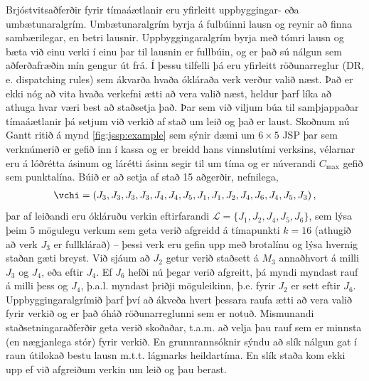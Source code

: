 \documentclass[]{article}
\begin{document}
Brjóstvitsaðferðir fyrir tímaáætlanir eru yfirleitt uppbyggingar- eða 
umbætunaralgrím.
Umbætunaralgrím byrja á fulbúinni lausn og reynir að finna sambærilegar, en 
betri lausnir. 
Uppbyggingaralgrím byrja með tómri lausn og bæta við einu verki í einu þar til 
lausnin er fullbúin, og er það sú nálgun sem aðferðafræðin mín gengur út frá. 
Í þessu tilfelli þá eru yfirleitt röðunarreglur (DR, e. dispatching 
rules) sem ákvarða hvaða ókláraða verk verður valið næst. Það er ekki nóg að 
vita hvaða verkefni ætti að vera valið næst, 
heldur þarf líka að athuga hvar væri best að staðsetja það. 
Þar sem við viljum búa til samþjappaðar tímaáætlanir  þá setjum við verkið af 
stað um leið og það er laust. 
Skoðnum nú Gantt ritið á mynd \ref{fig:jssp:example} sem sýnir dæmi um 
$6\times5$ JSP þar sem verknúmerið er gefið inn í kassa og er breidd hans 
vinnslutími verksins, 
vélarnar eru á lóðrétta ásinum og lárétti ásinn segir til um tíma 
og er núverandi $C_{\max}$ gefið sem punktalína. 
Búið er að setja af stað 15 aðgerðir, nefnilega, 
\begin{eqnarray}
\vchi=\left(J_3,J_3,J_3,J_3,J_4,J_4,J_5,J_1,J_1,J_2,J_4,J_6,J_4,J_5,J_3\right),
\end{eqnarray}
þar af leiðandi eru ókláruðu verkin eftirfarandi 
$\mathcal{L}=\{J_1,J_2,J_4,J_5,J_6\}$, sem lýsa þeim 5 mögulegu verkum sem geta 
verið afgreidd á tímapunkti $k=16$ (athugið að verk $J_3$ er fullklárað) -- 
þessi verk eru gefin upp með brotalínu og lýsa hvernig staðan gæti breyst. 
Við sjáum að $J_2$ getur verið staðsett á $M_3$ annaðhvort á milli  $J_3$ og 
$J_4$, eða eftir $J_4$.  Ef $J_6$ hefði nú þegar verið afgreitt, þá myndi 
myndast rauf á milli þess og $J_4$, þ.a.l. myndast þriðji möguleikinn, þ.e. 
fyrir $J_2$ er sett eftir $J_6$. 
Uppbyggingaralgrímið þarf því að ákveða hvert þessara raufa ætti að vera 
valið fyrir verkið og er það óháð röðunarreglunni sem er notuð. 
Mismunandi staðsetningaraðferðir geta verið skoðaðar, t.a.m. að velja þau rauf 
sem er minnsta (en nægjanlega stór) fyrir verkið. En grunnrannsóknir sýndu að 
slík nálgun gat í raun útilokað bestu lausn m.t.t. lágmarks heildartíma. 
En slík staða kom ekki upp ef við afgreiðum verkin um leið og þau berast. 
\end{document}
